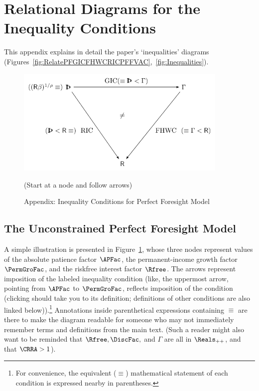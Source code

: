 \documentclass[\econtexRoot/BufferStockTheory]{subfiles}
\begin{document}
\hypertarget{ApndxConditionDiagrams}{}

\section{Relational Diagrams for the Inequality Conditions}\label{sec:ApndxConditionDiagrams}

This appendix explains in detail the paper's `inequalities' diagrams (Figures~\ref{fig:RelatePFGICFHWCRICPFFVAC},~\ref{fig:Inequalities}).

\hypertarget{InequalityPFGICFHWCRIC}{}
\begin{figure}
\centering
\includegraphics[width=4in]{Figures/InequalityPFGICFHWCRIC}
\caption{Appendix: Inequality Conditions for Perfect Foresight Model}
\centerline{ (Start at a node and follow arrows)}\label{fig:InequalityPFGICFHWCRIC}
\end{figure}

\subsection{The Unconstrained Perfect Foresight Model}

A simple illustration is presented in Figure~\ref{fig:InequalityPFGICFHWCRIC}, whose three nodes represent values of the absolute patience factor $\APFac$, the permanent-income growth factor $\PermGroFac$, and the riskfree interest factor $\Rfree$.
The arrows represent imposition of the labeled inequality condition  (like,  the uppermost arrow, pointing from {$\APFac$} to $\PermGroFac$, reflects imposition of the {\GICRaw} condition (clicking {\GICRaw} should take you to its definition; definitions of other conditions are also linked below)).\footnote{For convenience, the equivalent ($\equiv$) mathematical statement of each condition is expressed nearby in parentheses.}  Annotations inside parenthetical expressions containing $\equiv$ are there to make the diagram readable for someone who may not immediately remember terms and definitions from the main text.
(Such a reader might also want to be reminded that $\Rfree, \DiscFac, $ and $\Gamma$ are all in $\Reals_{++}$, and that $\CRRA>1$).
\end{document}
